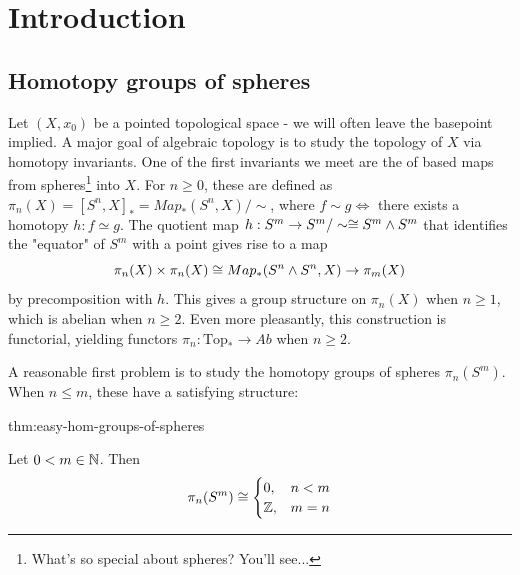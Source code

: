 \newpage
\section{Introduction}
\vspace{2ex}
\subsection{Homotopy groups of spheres}
Let $(X,x_0)$ be a pointed topological space - we will often leave the basepoint implied. A major goal of algebraic topology is to study the topology of $X$ via homotopy invariants. One of the first invariants we meet are the  of based maps from spheres\footnote{What's so special about spheres? You'll see...} into $X$. For $n\geq 0$, these are defined as $\pi_n(X)=[S^n,X]_*=Map_*(S^n,X)/\sim$, where $f\sim g\iff$ there exists a homotopy $h:f\simeq g$. The quotient map $h:S^m\rightarrow S^m/\sim \cong S^m\wedge S^m$ that identifies the "equator" of $S^m$ with a point gives rise to a map $$\pi_n(X)\times \pi_n(X)\cong Map_*(S^n\wedge S^n,X)\rightarrow \pi_m(X)$$ by precomposition with $h$. This gives a group structure on $\pi_n(X)$ when $n\geq 1$, which is abelian when $n\geq 2$. Even more pleasantly, this construction is functorial, yielding functors $\pi_n:\text{Top}_*\rightarrow Ab$ when $n\geq 2$.

A reasonable first problem is to study the homotopy groups of spheres $\pi_n (S^m)$. When $n\leq m$, these have a satisfying structure:

\begin{theorem}{thm:easy-hom-groups-of-spheres}

Let $0<m\in \mathbb{N}$. Then 
$$\pi_n(S^m)\cong\begin{cases}0,&n<m\\ \mathbb{Z}, & m=n\end{cases}$$
\end{theorem}

